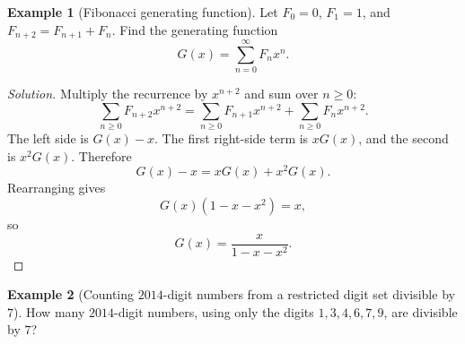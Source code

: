 \documentclass[11pt]{article}
\theoremstyle{definition}
\newtheorem{example}{Example}[section]
\begin{document}
\begin{example}[Fibonacci generating function]
Let $F_0=0$, $F_1=1$, and $F_{n+2}=F_{n+1}+F_n$. Find the generating function
\[
G(x)=\sum_{n=0}^{\infty} F_n x^n.
\]
\end{example}

\begin{proof}[Solution]
Multiply the recurrence by $x^{n+2}$ and sum over $n\ge 0$:
\[
\sum_{n\ge 0} F_{n+2}x^{n+2} = \sum_{n\ge 0} F_{n+1}x^{n+2} + \sum_{n\ge 0} F_n x^{n+2}.
\]
The left side is $G(x)-x$. The first right-side term is $xG(x)$, and the second is $x^2 G(x)$. Therefore
\[
G(x)-x = xG(x)+x^2G(x).
\]
Rearranging gives
\[
G(x)(1-x-x^2)=x,
\]
so
\[
\boxed{G(x)=\frac{x}{1-x-x^2}}.
\]
\end{proof}

\begin{example}[Counting $2014$-digit numbers from a restricted digit set divisible by $7$]
How many $2014$-digit numbers, using only the digits $1,3,4,6,7,9$, are divisible by $7$?
\end{example}
\end{document}
